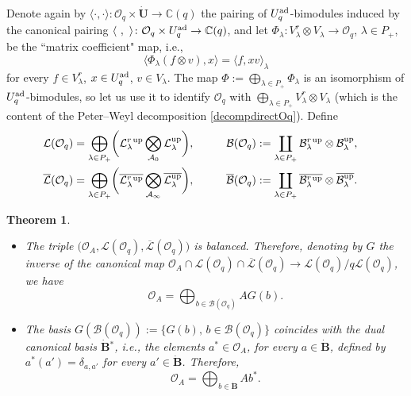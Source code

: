 \documentclass[10pt,a4paper]{amsart}
\numberwithin{equation}{section}
\newtheorem{teo}{Theorem}[section]
\theoremstyle{definition}
\newcommand{\Oq}{\Oo_{q}}
\newcommand{\mc}{\mathbb{C}}
\newcommand{\Ll}{{\mathcal L}}
\newcommand{\Oo}{{\mathcal O}}
\newcommand{\ra}{\rightarrow}
\begin{document}
Denote again by $\langle\cdot,\cdot \rangle \colon \Oq \times \dot{\mathbf{U}} \ra \mc(q)$ the pairing of $U_q^{\rm ad}$-bimodules induced by the canonical pairing $\langle\ ,\ \rangle \colon \Oq \times U_q^{\rm ad} \ra \mc(q)$, and let $\Phi_\lambda\colon V_\lambda^r \otimes V_\lambda \ra \Oo_q$, $\lambda\in P_+$, be the ``matrix coefficient" map, i.e.,
\begin{equation}\label{pairingOAKashi}
\langle \Phi_\lambda (f \otimes v),x\rangle = \langle f, xv\rangle_\lambda
\end{equation}
for every $f\in V_\lambda^r$, $x\in U_q^{\rm ad}$, $v\in V_\lambda$. The map $\Phi := \bigoplus_{\lambda\in P_+} \Phi_\lambda$ is an isomorphism of $U_q^{\rm ad}$-bimodules, so let us use it to identify $\Oo_q$ with $\bigoplus_{\lambda\in P_+} V_\lambda^r \otimes V_\lambda$ (which is the content of the Peter--Weyl decomposition \eqref{decompdirectOq}). Define
\begin{alignat*}{3}
& \Ll(\Oo_q) = \bigoplus_{\lambda\in P_+} \biggl(\Ll_{\lambda}^r {}^{\rm up} \bigotimes_{\mathcal{A}_0} \Ll_{\lambda}^{\rm up}\biggr),\qquad && \mathcal{B}(\Oo_q) := \coprod_{\lambda\in P_+} \mathcal{B}_\lambda^r {}^{\rm up} \otimes \mathcal{B}_\lambda^{\rm up},& \\
& \overline{\Ll}(\Oo_q) = \bigoplus_{\lambda\in P_+} \biggl(\overline{\Ll_{\lambda}^r {}^{\rm up}} \bigotimes_{\mathcal{A}_\infty} \overline{\Ll_{\lambda}^{\rm up}}\biggr),\qquad && \overline{\mathcal{B}}(\Oo_q) := \coprod_{\lambda\in P_+} \overline{\mathcal{B}_\lambda^r {}^{\rm up}} \otimes \overline{\mathcal{B}_\lambda^{\rm up}}.&
\end{alignat*}
\begin{teo}\label{canKashi} \quad
\begin{itemize}\itemsep=0pt
\item[$(i)$] The triple $\big(\Oo_A,\Ll(\Oo_q),\overline{\Ll}(\Oo_q)\big)$ is balanced. Therefore, denoting by $G$ the inverse of the canonical map $\Oo_A \cap \Ll(\Oo_q) \cap \overline{\Ll}(\Oo_q)\ra \Ll(\Oo_q)/q\Ll(\Oo_q)$, we have
\[\Oo_A = \bigoplus_{b\in \mathcal{B}(\Oo_q)} A G(b).\]
\item[$(ii)$] The basis $G(\mathcal{B}(\Oo_q)):=\{G(b), \, b\in \mathcal{B}(\Oo_q)\}$ coincides with the dual canonical basis $\dot{\mathbf{B}} {}^*$, i.e., the elements $a^* \in \Oo_A$, for every $a\in \dot{\mathbf{B}}$, defined by $a^* (a') = \delta_{a,a'}$ for every $a'\in \dot{\mathbf{B}}$. Therefore, \[\Oo_A = \bigoplus_{b\in \dot{\mathbf{B}}} Ab^*.\]
\end{itemize}
\end{teo}
\end{document}

